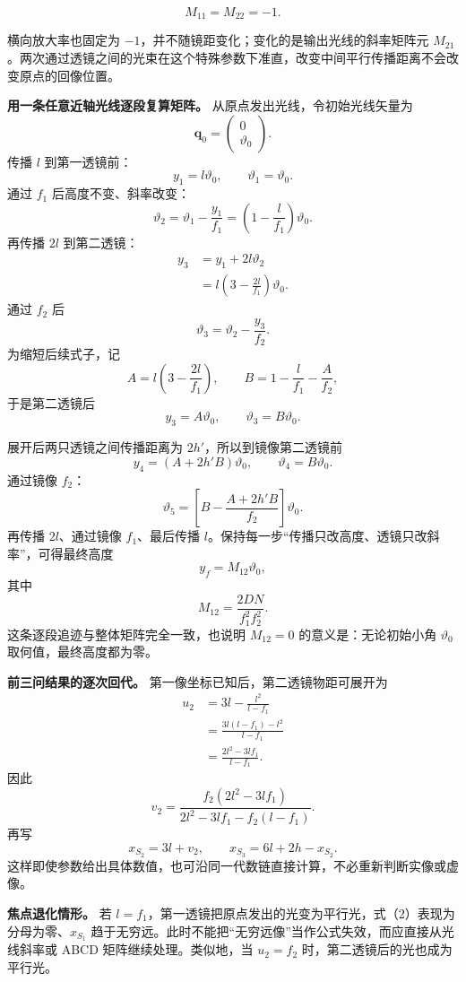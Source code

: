 \documentclass[12pt,a4paper,UTF8]{ctexart}
\begin{document}
\[M_{11}=M_{22}=-1.\]

横向放大率也固定为 \(-1\)，并不随镜距变化；变化的是输出光线的斜率矩阵元
\(M_{21}\)。两次通过透镜之间的光束在这个特殊参数下准直，改变中间平行传播距离不会改变原点的回像位置。

\textbf{用一条任意近轴光线逐段复算矩阵。}
从原点发出光线，令初始光线矢量为 \[
\boldsymbol q_0=
\begin{pmatrix}0\\ \vartheta_0\end{pmatrix}.
\] 传播 \(l\) 到第一透镜前： \[
y_1=l\vartheta_0,
\qquad
\vartheta_1=\vartheta_0.
\] 通过 \(f_1\) 后高度不变、斜率改变： \[
\vartheta_2
=\vartheta_1-\frac{y_1}{f_1}
=\left(1-\frac l{f_1}\right)\vartheta_0.
\] 再传播 \(2l\) 到第二透镜： \[
\begin{aligned}
y_3
&=y_1+2l\vartheta_2\\
&=l\left(3-\frac{2l}{f_1}\right)\vartheta_0.
\end{aligned}
\] 通过 \(f_2\) 后 \[
\vartheta_3
=\vartheta_2-\frac{y_3}{f_2}.
\] 为缩短后续式子，记 \[
A=l\left(3-\frac{2l}{f_1}\right),
\qquad
B=1-\frac l{f_1}-\frac A{f_2},
\] 于是第二透镜后 \[
y_3=A\vartheta_0,
\qquad
\vartheta_3=B\vartheta_0.
\]

展开后两只透镜之间传播距离为 \(2h'\)，所以到镜像第二透镜前 \[
y_4=(A+2h'B)\vartheta_0,
\qquad
\vartheta_4=B\vartheta_0.
\] 通过镜像 \(f_2\)： \[
\vartheta_5
=\left[
B-\frac{A+2h'B}{f_2}
\right]\vartheta_0.
\] 再传播 \(2l\)、通过镜像 \(f_1\)、最后传播
\(l\)。保持每一步``传播只改高度、透镜只改斜率''，可得最终高度 \[
y_f=M_{12}\vartheta_0,
\] 其中 \[
M_{12}
=\frac{2DN}{f_1^2f_2^2}.
\] 这条逐段追迹与整体矩阵完全一致，也说明 \(M_{12}=0\)
的意义是：无论初始小角 \(\vartheta_0\) 取何值，最终高度都为零。

\textbf{前三问结果的逐次回代。} 第一像坐标已知后，第二透镜物距可展开为
\[
\begin{aligned}
u_2
&=3l-\frac{l^2}{l-f_1}\\
&=\frac{3l(l-f_1)-l^2}{l-f_1}\\
&=\frac{2l^2-3lf_1}{l-f_1}.
\end{aligned}
\] 因此 \[
v_2
=\frac{f_2(2l^2-3lf_1)}
{2l^2-3lf_1-f_2(l-f_1)}.
\] 再写 \[
x_{S_2}=3l+v_2,
\qquad
x_{S_3}=6l+2h-x_{S_2}.
\]
这样即使参数给出具体数值，也可沿同一代数链直接计算，不必重新判断实像或虚像。

\textbf{焦点退化情形。} 若
\(l=f_1\)，第一透镜把原点发出的光变为平行光，式（2）表现为分母为零、\(x_{S_1}\)
趋于无穷远。此时不能把``无穷远像''当作公式失效，而应直接从光线斜率或
ABCD 矩阵继续处理。类似地，当 \(u_2=f_2\)
时，第二透镜后的光也成为平行光。
\end{document}
